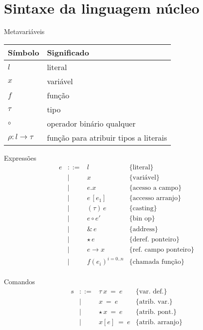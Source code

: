 \documentclass{beamer}
\begin{document}
   \section{Sintaxe da linguagem núcleo}
   \begin{frame}{Metavariáveis}
     \begin{table}
     \begin{tabular}{|l|l|}
       \hline
       Símbolo & Significado \\ \hline
		$l$ & {literal} \\
		$x$ & {variável}\\
		$f$  & função \\
		$\tau$ & {tipo}\\
		$\circ$ & {operador binário qualquer}\\
                $\rho : l \to \tau$ & {função para atribuir tipos a literais}\\
		\hline
		\end{tabular}
           \centering
       \end{table}
   \end{frame}
   \begin{frame}{Expressões}
\[
\begin{array}{lcll}
	e & ::= & l & \{\text{literal}\} \\
	& \mid & x & \{\text{variável}\} \\
	& \mid & e . x & \{\text{acesso a campo}\}\\
	& \mid & e\,[e_1] & \{\text{accesso arranjo}\} \\
	& \mid & (\tau)\,e & \{\text{casting}\} \\
	&\mid & e\circ e' & \{\text{bin op}\} \\
	& \mid & \&\,e & \{\text{address}\} \\
	& \mid & \star\,e & \{\text{deref. ponteiro}\}\\
	& \mid & e \to x & \{\text{ref. campo ponteiro}\}\\
	& \mid & f(e_i)^{i=0..n} & \{\text{chamada função}\}\\
\end{array} \]
   \end{frame}
   \begin{frame}{Comandos}
     \[
\begin{array}{lcll}
	s & ::=   & \tau\:x\:=\:e & \{\text{var. def.}\} \\
	& \mid & x\:=\:e & \{\text{atrib. var.}\} \\
	& \mid & \star\,x\:=\:e & \{\text{atrib. pont.}\} \\
	& \mid & x[e]\:=\:e &\{\text{atrib. arranjo}\} \\
\end{array} \]
   \end{frame}
\end{document}
